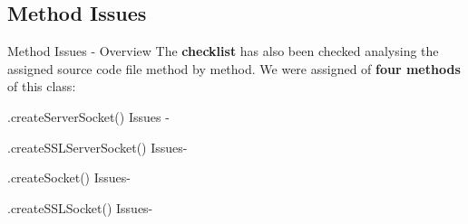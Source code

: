 \documentclass{../common/latex_classes/pdf_presentation}
\begin{document}
	\subsection{Method Issues}
	
	\begin{frame}{Method Issues - Overview}
		The \textbf{checklist} has also been checked analysing the assigned source code file method by method.
		We were assigned of \textbf{four methods} of this class:
		\begin{itemize}
		\end{itemize}
	\end{frame}
	
	\begin{frame}{.createServerSocket() Issues -}
	\end{frame}
	
	\begin{frame}{.createSSLServerSocket() Issues-}
	\end{frame}
	
	\begin{frame}{.createSocket() Issues-}
	\end{frame}
	
	\begin{frame}{.createSSLSocket() Issues-}
	\end{frame}
	
\end{document}
